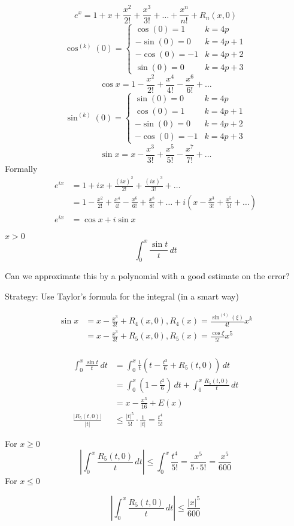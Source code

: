 \[e^x = 1 + x + \frac{x^2}{2!} + \frac{x^3}{3!} + \dotsc + \frac{x^n}{n!} + R_n(x, 0)\]
\[\cos^{(k)}(0) = \begin{cases}
  \cos(0) = 1 & k = 4p\\
  -\sin(0) = 0 & k = 4p + 1\\
  -\cos(0) = -1 & k = 4p + 2\\
  \sin(0) = 0 & k = 4p + 3
\end{cases}\]
\[\cos x = 1 - \frac{x^2}{2!} + \frac{x^4}{4!} - \frac{x^6}{6!} + \dotsc \]
\[\sin^{(k)}(0) = \begin{cases}
  \sin(0) = 0 & k = 4p\\
  \cos(0) = 1 & k = 4p + 1\\
  -\sin(0) = 0 & k = 4p + 2\\
  -\cos(0) = -1 & k = 4p + 3
\end{cases}\]
\[\sin x = x - \frac{x^3}{3!} + \frac{x^5}{5!} - \frac{x^7}{7!} + \dotsc \]
Formally
\begin{align*}
  e^{ix} &= 1 + ix + \frac{(ix)^2}{2!} + \frac{(ix)^3}{3!} + \dotsc \\
  &= 1 - \frac{x^2}{2!} + \frac{x^4}{4!} - \frac{x^6}{6!} + \frac{x^8}{8!} + \dotsc + i\left( x - \frac{x^3}{3!} + \frac{x^5}{5!} + \dotsc \right)\\
  e^{ix} &= \cos x + i\sin x
\end{align*}

\begin{example*}
  $x > 0$
  \[\int_0^x \frac{\sin t}{t}\, dt\]

  Can we approximate this by a polynomial with a good estimate on the error?
\end{example*}

Strategy: Use Taylor's formula for the integral (in a smart way)

\begin{align*}
  \sin x &= x - \frac{x^3}{3!} + R_4(x, 0), R_4(x) = \frac{\sin^(4)(\xi)}{4!}x^k \\
  &= x - \frac{x^3}{3!} + R_5(x, 0), R_5(x) = \frac{\cos \xi}{5!}x^5 \\ 
\end{align*}

\begin{align*}
  \int_0^x \frac{\sin t}{t}\, dt &= \int_0^x \frac{1}{t}\left(t - \frac{t^3}{6} + R_5(t, 0) \right)\, dt \\
  &= \int_0^x \left(1 - \frac{t^2}{6}\right)\,dt + \int_0^x \frac{R_5(t, 0)}{t}\, dt \\
  &= x-\frac{x^3}{16} + E(x) \\
  \frac{|R_5(t, 0)|}{|t|}&\le \frac{|t|^5}{5!}\cdot\frac{1}{|t|} = \frac{t^4}{5!} 
\end{align*}

For $x \ge 0$
\[\left|\int_0^x \frac{R_5(t, 0)}{t} \, dt \right|\le \int_0^x \frac{t^4}{5!} = \frac{x^5}{5\cdot5!} = \frac{x^5}{600}\]
For $x \le 0$

\[\left|\int_0^x \frac{R_5(t, 0)}{t} \, dt\right| \le \frac{|x|^5}{600}\]




